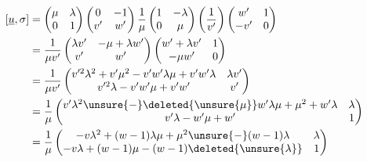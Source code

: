 
\[
\begin{aligned}
{}[\underline u,\sigma]
&=\begin{pmatrix}\mu&\lambda\\0&1\end{pmatrix}
\begin{pmatrix}0&-1\\v'&w'\end{pmatrix}
\frac1\mu\begin{pmatrix}1&-\lambda\\0&\mu\end{pmatrix}
\left(\frac1{v'}\right)\begin{pmatrix}w'&1\\-v'&0\end{pmatrix}\\
&=\frac1{\mu v'}\begin{pmatrix}\lambda v'&-\mu+\lambda w'\\v'&w'\end{pmatrix}
\begin{pmatrix}w'+\lambda v'&1\\-\mu w'&0\end{pmatrix}\\
&=\frac1{\mu v'}\begin{pmatrix}
v'^2\lambda^2+v'\mu^2-v'w'\lambda\mu+v'w'\lambda&\lambda v'\\
v'^2\lambda-v'w'\mu+v'w'&v'
\end{pmatrix}\\
&=\frac1\mu\begin{pmatrix}
v'\lambda^2\unsure{-}\deleted{\unsure{\mu}}w'\lambda\mu+\mu^2+w'\lambda&\lambda\\
v'\lambda-w'\mu+w'&1
\end{pmatrix}\\
&=\frac1\mu\begin{pmatrix}
-v\lambda^2+(w-1)\lambda\mu+\mu^2\unsure{-}(w-1)\lambda&\lambda\\
-v\lambda+(w-1)\mu-(w-1)\deleted{\unsure{\lambda}}&1
\end{pmatrix}
\end{aligned}
\]

